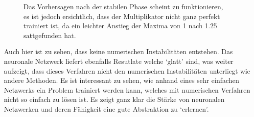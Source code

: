 \begin{figure}
\begin{tabular}{ccc}
	\end{tabular}
	\caption{Das Vorhersagen nach der stabilen Phase scheint
	zu funktionieren, es ist jedoch ersichtlich, dass der
	Multiplikator nicht ganz perfekt trainiert ist, da ein
	leichter Anstieg der Maxima von 1 nach 1.25 sattgefunden
	hat.
	\label{fig:mst_burgers_predict_2}
	}
\end{figure}

Auch hier ist zu sehen, dass keine numerischen Instabilitäten entstehen. Das neuronale Netzwerk liefert ebenfalls Resutlate welche `glatt' sind, was weiter aufzeigt, dass dieses Verfahren nicht den numerischen Instabilitäten unterliegt wie andere Methoden. Es ist interessant zu sehen, wie anhand eines sehr einfachen Netzwerks ein Problem trainiert werden kann, welches mit numerischen Verfahren nicht so einfach zu lösen ist. Es zeigt ganz klar die Stärke von neuronalen Netzwerken und deren Fähigkeit eine gute Abstraktion zu `erlernen'.
